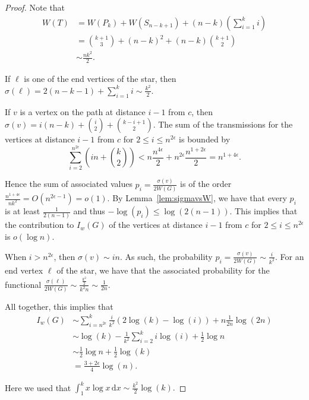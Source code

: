\documentclass{article}
\def \d{\, \mathrm{d}}
\begin{document}
{\begin{proof}
    Note that 
    \begin{align*}
        W(T)&=W(P_k)+W(S_{n-k+1})+(n-k) \left(\sum_{i=1}^k i\right)\\
        &=\binom{k+1}{3} +(n-k)^2+(n-k)\binom{k+1}{2}\\
        &\sim \frac{nk^2}{2}.
    \end{align*}
    
    
    If $\ell$ is one of the end vertices of the star, then $\sigma(\ell)=2(n-k-1)+\sum_{i=1}^k i \sim \frac{k^2}{2}.$
    
    
    If $v$ is a vertex on the path at distance $i-1$ from $c$, then $\sigma(v)=i(n-k)+ \binom{i}{2}+\binom{k-i+1}{2}.$
    The sum of the transmissions for the vertices at distance $i-1$ from $c$ for $2\le i \le n^{2\epsilon}$ is bounded by
    $$\sum_{i=2}^{ n^{2\epsilon}} \left(in + \binom{k}{2}\right) < n\frac{n^{4\epsilon}}{2} + n^{2\epsilon} \frac{n^{1+2\epsilon}}{2}=n^{1+4\epsilon}.$$
    
    Hence the sum of associated values $p_i=\frac{\sigma(v)}{2W(G)}$ is of the order
    $\frac{n^{1+4\epsilon}}{nk^2}=O(n^{2\epsilon-1})=o(1).$
    By Lemma~\ref{lem:sigmavsW}, we have that every $p_i$ is at least $\frac{1}{2(n-1)}$ and thus $- \log(p_i) \le \log(2(n-1)).$
    This implies that the contribution to $I_w(G)$ of the vertices at distance $i-1$ from $c$ for $2\le i \le n^{2\epsilon}$ is $o(\log n).$
    
    When $i>n^{2\epsilon}$, then $\sigma(v) \sim in.$
    As such, the probability $p_i =\frac{\sigma(v) }{2W(G)} \sim \frac{i}{k^2}.$
    For an end vertex $\ell$ of the star, we have that the associated probability for the functional $\frac{\sigma(\ell) }{2W(G)} \sim \frac{ \frac{k^2}{2}}{k^2n} \sim \frac{1}{2n}.$
    
    All together, this implies that 
    \begin{align*}
        I_w(G) &\sim \sum_{i=n^{2\epsilon}}^k \frac{i}{k^2} \left(2\log(k)-\log(i)\right) + n \frac{1}{2n} \log(2n)\\
        &\sim \log(k) - \frac{1}{k^2} \sum_{i=2}^k i \log(i)  +\frac 12 \log n\\
        &\sim \frac 12 \log n + \frac 12 \log(k)\\
        &=\frac{3+2\epsilon}{4} \log(n).
    \end{align*}
    
    Here we used that $\int_1^k x \log x \d x \sim \frac{k^2}{2} \log(k).$ %
\end{proof}



}
\end{document}
